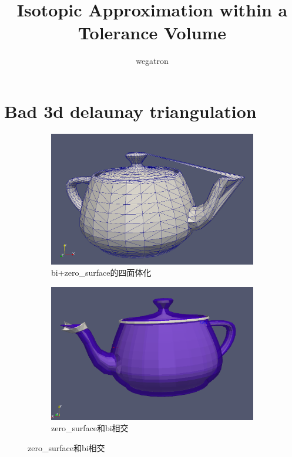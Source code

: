 \documentclass{article}
\title{Isotopic Approximation within a Tolerance Volume}
\author{wegatron\\
}
\theoremstyle{definition}
\theoremstyle{remark}
\begin{document}
\maketitle

\section{Bad 3d delaunay triangulation}
  \begin{figure}[h]
    \begin{subfigure}[b]{0.4\textwidth}
      \includegraphics[width=\textwidth]{bad_surface0.png}
      \caption[现象]{bi+zero\_surface的四面体化}
    \end{subfigure}
    \begin{subfigure}[b]{0.4\textwidth}
      \includegraphics[width=\textwidth]{bad_surface1.png}
      \caption[原因]{zero\_surface和bi相交}
    \end{subfigure}
  \end{figure}
\end{document}
